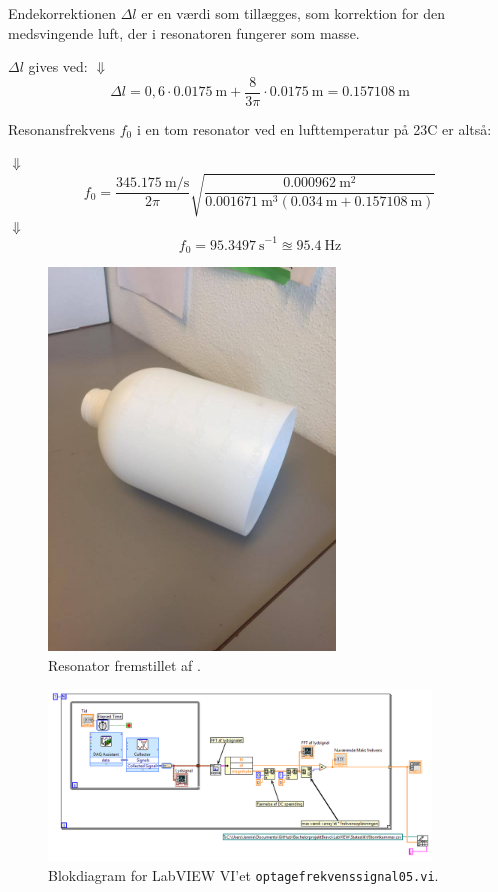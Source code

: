 Endekorrektionen $\Delta l$ er en værdi som tillægges, som korrektion for den medsvingende luft, der i resonatoren fungerer som masse. 

$\Delta l$ gives ved: \deltal
$\Downarrow$
\begin{equation}
		\Delta l = 0,6 \cdot {\SI{0,0175}{\meter}} + \frac{8}{3\pi} \cdot {\SI{0,0175}{\meter}} = {\SI{0,157108}{\meter}} 
\end{equation}

Resonansfrekvens $f_{0}$ i en tom resonator ved en lufttemperatur på 23\degree C er altså:

\fnul
$\Downarrow$   
\begin{equation}
		f_{0} = \frac{\SI{345,175}{\meter / \second}}{2\pi}\sqrt{\frac{\SI{0,000962}{\meter^{2}}}{{\SI{0,001671}{\meter^{3}}}({\SI{0,034}{\meter}}+{\SI{0,157108}{\meter}})}} 
	\end{equation}	
$\Downarrow$
\begin{equation}
	f_{0} = {\SI{95,3497}{\second}^{-1}} \approxeq {\SI{95,4}{\hertz}} 	
	\end{equation}
	


	
	\begin{figure}[htb]
	\centering
	\includegraphics[width=3in]{resonator.jpg}
	\caption{Resonator fremstillet af .}
	\label{fig:resonator}	
	\end{figure}

	\begin{figure}[htb]
	\centering
	\includegraphics[width=4in]{optagefrekvenssignal05.png}
	\caption{Blokdiagram for LabVIEW VI'et \texttt{optagefrekvenssignal05.vi}.}
	\label{fig:optagefrekvenssignal05}	
	\end{figure}
	
